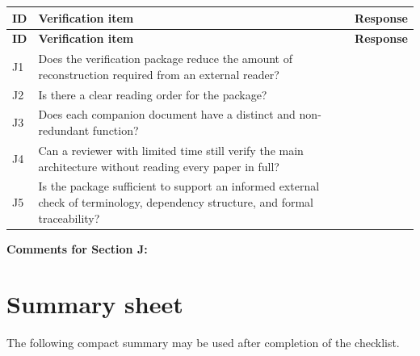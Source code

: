 \documentclass[11pt,a4paper]{article}
\begin{document}
	\begin{longtable}{>{\RaggedRight\arraybackslash}p{}
			>{\RaggedRight\arraybackslash}p{}
			>{\RaggedRight\arraybackslash}p{}}
		\toprule
		\textbf{ID} & \textbf{Verification item} & \textbf{Response} \\
		\midrule
		\endfirsthead
		\toprule
		\textbf{ID} & \textbf{Verification item} & \textbf{Response} \\
		\midrule
		\endhead
		
		J1 & Does the verification package reduce the amount of reconstruction required from an external reader? & \\
		
		J2 & Is there a clear reading order for the package? & \\
		
		J3 & Does each companion document have a distinct and non-redundant function? & \\
		
		J4 & Can a reviewer with limited time still verify the main architecture without reading every paper in full? & \\
		
		J5 & Is the package sufficient to support an informed external check of terminology, dependency structure, and formal traceability? & \\
		
		\bottomrule
	\end{longtable}
	
	\textbf{Comments for Section J:}
	
	\vspace{3em}
	
	\section{Summary sheet}
	
	The following compact summary may be used after completion of the checklist.
	
\end{document}
